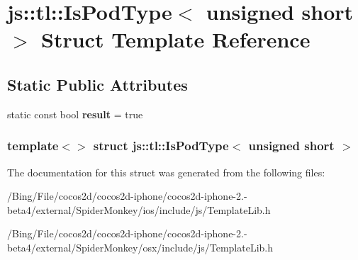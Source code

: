 \hypertarget{structjs_1_1tl_1_1_is_pod_type_3_01unsigned_01short_01_4}{\section{js\-:\-:tl\-:\-:Is\-Pod\-Type$<$ unsigned short $>$ Struct Template Reference}
\label{structjs_1_1tl_1_1_is_pod_type_3_01unsigned_01short_01_4}
}
\subsection*{Static Public Attributes}
\begin{DoxyCompactItemize}
\item 
\hypertarget{structjs_1_1tl_1_1_is_pod_type_3_01unsigned_01short_01_4_a02edb550278312488cc9a58ea862449e}{static const bool {\bfseries result} = true}\label{structjs_1_1tl_1_1_is_pod_type_3_01unsigned_01short_01_4_a02edb550278312488cc9a58ea862449e}

\end{DoxyCompactItemize}
\subsubsection*{template$<$$>$ struct js\-::tl\-::\-Is\-Pod\-Type$<$ unsigned short $>$}



The documentation for this struct was generated from the following files\-:\begin{DoxyCompactItemize}
\item 
/\-Bing/\-File/cocos2d/cocos2d-\/iphone/cocos2d-\/iphone-\/2.-\/beta4/external/\-Spider\-Monkey/ios/include/js/Template\-Lib.\-h\item 
/\-Bing/\-File/cocos2d/cocos2d-\/iphone/cocos2d-\/iphone-\/2.-\/beta4/external/\-Spider\-Monkey/osx/include/js/Template\-Lib.\-h\end{DoxyCompactItemize}
